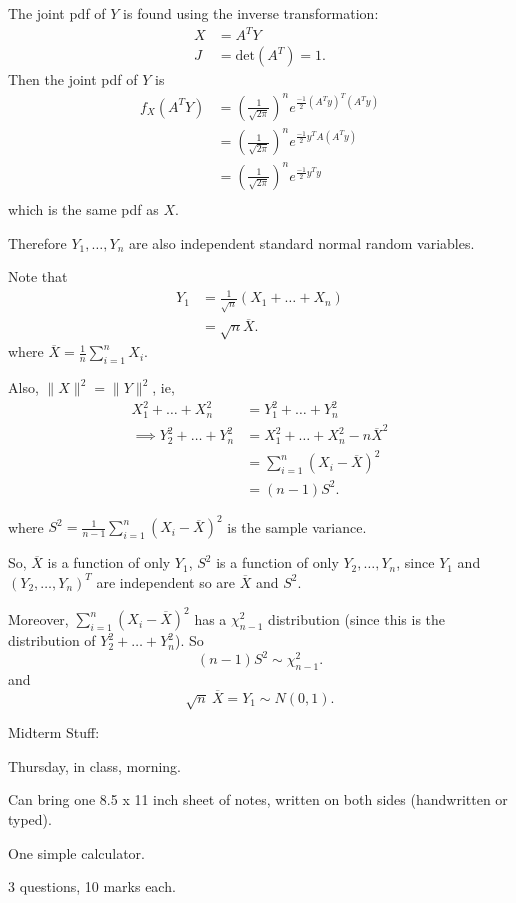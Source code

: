 \begin{enumerate}
		The joint pdf of $Y$ is found using the inverse transformation:
		\begin{align*}
			X &= A^{T}Y \\
			J &= \text{det}\left( A^{T} \right)  = 1
		.\end{align*}
		Then the joint pdf of $Y$ is 
		\begin{align*}
			f_{X}\left( A^{T}Y \right) &= \left( \frac{1}{\sqrt{2\pi} } \right)^{n} e ^{\frac{-1}{2} \left( A^{T}y \right) ^{T}\left( A^{T}y \right) } \\
			&= \left( \frac{1}{\sqrt{2\pi} } \right)^{n} e ^{\frac{-1}{2}  y^{T}A \left( A^{T}y \right) } \\
			&= \left( \frac{1}{\sqrt{2\pi} } \right)^{n} e ^{\frac{-1}{2}  y^{T}y} \\
		\end{align*}
which is the same pdf as $X$.

Therefore $Y_{1} , \ldots , Y_{n}$ are also independent standard normal random variables.

Note that 
 \begin{align*}
	 Y_1 &= \frac{1}{\sqrt{n} }\left( X_1 + \ldots + X_{n} \right)  \\
	 &= \sqrt{n} \overline{X}
.\end{align*}
where $\overline{X} = \frac{1}{n}\sum_{i=1}^{n} X_{i}$.

Also, $\|X\|^2 = \|Y\|^2$, ie, 
\begin{align*}
	X_1^2 + \ldots + X_{n}^2 &= Y_1^2 + \ldots + Y_{n}^2 \\
	\implies Y_2 ^2 + \ldots + Y_{n}^2 &=  X_1^2 + \ldots + X_{n}^2 - n\overline{X}^2\\
					   &= \sum_{i=1}^{n} \left( X_{i} - \overline{X} \right) ^2 \\
					   &= \left( n-1  \right) S^2
.\end{align*}

where $S^2 = \frac{1}{n-1}\sum_{i=1}^{n} \left( X_{i} - \overline{X} \right) ^2$ is the sample variance.

So, $\overline{X}$ is a function of only $Y_1$, $S^2$ is a function of only $Y_{2} , \ldots , Y_{n}$, since $Y_1$ and $\left( Y_{2} , \ldots , Y_{n} \right)^{T} $ are independent so are $\overline{X}$ and $S^2$.

Moreover, $\sum_{i=1}^{n} \left( X_{i} - \overline{X} \right) ^2$ has a $\chi ^2_{n-1}$ distribution (since this is the distribution of $Y_{2}^2 + \ldots + Y_{n}^2$). So 
\[
	\left( n-1 \right) S^2 \sim \chi ^2_{n-1}
.\] and
\[
	\sqrt{n} \ \overline{X} = Y_1 \sim N\left( 0,1 \right) 
.\] 

\begin{note}
	Midterm Stuff:

	Thursday, in class, morning.

	Can bring one 8.5 x 11 inch sheet of notes, written on both sides (handwritten or typed).

	One simple calculator. 

	3 questions, 10 marks each.
\end{note}
\end{enumerate}
